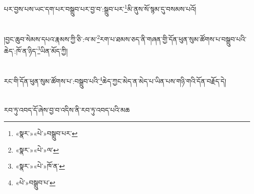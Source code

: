 པར་བྱས་པས་ཡང་དག་པར་བསྒྲུབ་པར་བྱ་བ་:སྒྲུབ་པར་\footnote{«སྣར་»«པེ་»བསྒྲུབ་པར་}མི་ནུས་སོ་སྙམ་དུ་བསམས་པའོ།\chapter{ }།བྱང་ཆུབ་སེམས་དཔའ་རྣམས་ཀྱི་ཅི་:ལ་མ་\footnote{«སྣར་»«པེ་»ལ་}རག་པ་ཐམས་ཅད་ནི་གཞན་གྱི་དོན་ཕུན་སུམ་ཚོགས་པ་བསྒྲུབ་པའི་ཆེད་:ཁོ་ན་ཉིད་\footnote{«སྣར་»«པེ་»ཁོ་ན་}ཡིན་མོད་ཀྱི།\chapter{ }རང་གི་དོན་ཕུན་སུམ་ཚོགས་པ་:བསྒྲུབ་པའི་\footnote{«པེ་»བསྒྲུབ་པ་}ཆེད་ཀྱང་མེད་ན་མེད་པ་ཡིན་པས་གཉི་གའི་དོན་བརྗོད་དེ།\chapter{ }རབ་ཏུ་འབད་དོ་ཞེས་བྱ་བ་འདིས་ནི་རབ་ཏུ་འབད་པའི་མཆ